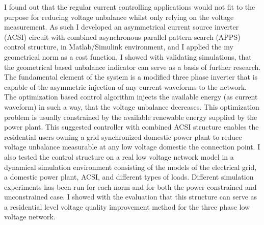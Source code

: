      I found out that the regular current controlling applications would not fit to the purpose for reducing voltage unbalance whilst only relying on the voltage measurement. As such I developed an asymmetrical current source inverter (ACSI) circuit with combined asynchronous parallel pattern search (APPS) control structure, in Matlab/Simulink environment, and I applied the my geometrical norm as a cost function. I showed with validating simulations, that the geometrical based unbalance indicator can serve as a basis of further research. 
		The fundamental element of the system is a modified three phase inverter that is capable of the asymmetric injection of any current waveforms to the network. The optimization based control algorithm injects the available energy (as current waveform) in such a way, that the voltage unbalance decreases. This optimization problem is usually constrained by the available renewable energy supplied by the power plant. This suggested controller with combined ACSI structure enables the residential users owning a grid synchronized domestic power plant to reduce voltage unbalance measurable at any low voltage domestic the connection point.
    I also tested the control structure on a real low voltage network model in a dynamical simulation environment consisting of the models of the electrical grid, a domestic power plant, ACSI, and different types of loads. Different simulation experiments has been run for each norm and for both the power constrained and unconstrained case. I showed with the evaluation that this structure can serve as a residential level voltage quality improvement method for the three phase low voltage network.
